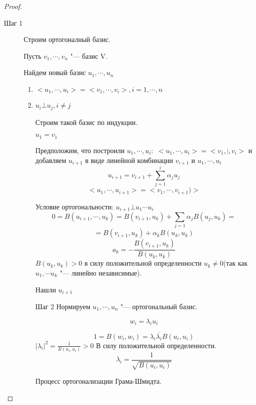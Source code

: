 \begin{proof}
 \begin{description}
  \item[Шаг 1]  Строим ортогоналный базис.

  Пусть $v_1, \cdots, v_n$ "--- базис V.

  Найдем новый базис $u_1, \cdots, u_n$
  \begin{enumerate}
  \item $<u_1, \cdots, u_i> = <v_1,\cdots, v_i>, i = 1, \cdots, n$
  \item $u_i \bot u_j, i \ne j$

  Строим такой базис по индукции. 

  $u_1 = v_1$

  Предположим, что построили $u_1, \cdots, u_i \colon$
  $<u_1, \cdots, u_i> = <v_1, \vdots, v_i>$ и
  добавляем $u_{i + 1}$ в виде линейной комбинации $v_{i + 1}$ и $u_1, \cdots, u_i$
  $$u_{i + 1} = v_{i + 1} + \sum_{j = 1}^{i} \alpha_{j}u_j$$
  $$<u_1, \cdots, u_{i + 1}> = <v_1, \cdots, v_{i + 1})> $$

  Условие ортогональности: $u_{i + 1} \bot u_1 \cdots u_i$
  $$0 = B(u_{i + 1}, \cdots, u_k) = B(v_{i + 1}, u_k) + \sum_{j = 1} \alpha_j B(u_j, u_k) = $$
  $$= B(v_{i + 1}, u_k)  + \alpha_{k}B(u_k, u_k)$$
  $$a_k = -\frac{B(v_{i + 1}, u_k)}{B(u_k, u_k)} $$
  $B(u_k, u_k) > 0$ в силу положительной определенности $u_k \ne 0$(так как $u_1, \cdots u_k$ "--- линейно независимые).
  
  Нашли $u_{i + 1}$
  \item[Шаг 2] Нормируем 
  $u_1, \cdots, u_n$ "--- ортогональный базис.

  $$w_i = \lambda_i u_i$$
  
  $$1 = B(w_i, w_i) = \lambda_i \overline{\lambda_i}B(u_i, u_i) $$
  $|\lambda_i|^2 = \frac{1}{B(u_i, u_i)} > 0$ В силу положительной определенности.
  $$\lambda_i = \frac{1}{\sqrt{B(u_i, u_i)}}$$

  Процесс ортогонализации Грама-Шмидта.
  \end{enumerate}
 \end{description}
\end{proof}